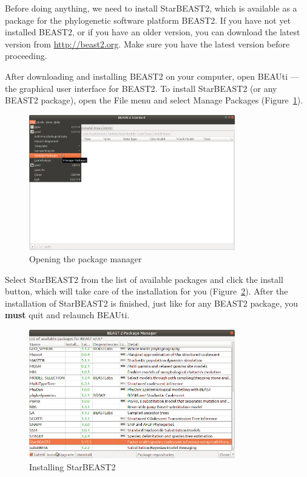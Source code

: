 \documentclass[12pt]{article}
\begin{document}
Before doing anything, we need to install StarBEAST2, which is available as a package for
the phylogenetic software platform BEAST2. If you have not yet installed BEAST2,
or if you have an older version, you can download the latest version from \url{http://beast2.org}.
Make sure you have the latest version before proceeding.

After downloading and installing BEAST2 on your computer, open BEAUti ---
the graphical user interface for BEAST2. To install StarBEAST2 (or
any BEAST2 package), open the File menu and select Manage Packages (Figure~\ref{fig:managePackages}).

\begin{figure}[htb!]
\centering
\includegraphics[width=0.8\textwidth]{figures/managePackages.png}
\caption
{Opening the package manager}
\label{fig:managePackages}
\end{figure}

Select StarBEAST2 from the list of available packages and click the install button, which will take
care of the installation for you (Figure~\ref{fig:installStarBEAST2}). After the installation of StarBEAST2 is finished, just like for any BEAST2 package, you
\textbf{must} quit and relaunch BEAUti.

\begin{figure}[htb!]
\centering
\includegraphics[width=0.8\textwidth]{figures/installStarBEAST2.png}
\caption
{Installing StarBEAST2}
\label{fig:installStarBEAST2}
\end{figure}
\end{document}
